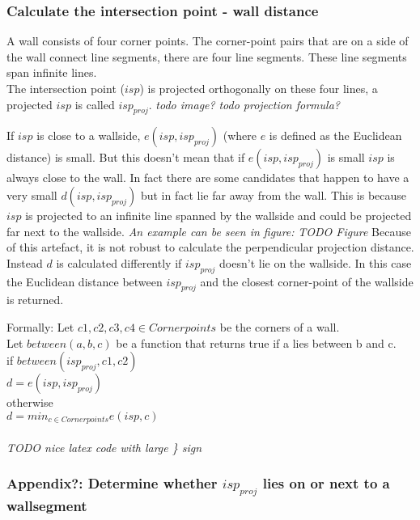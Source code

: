 \documentclass[10pt]{article}
\begin{document}
\subsubsection{Calculate the intersection point - wall distance}
A wall consists of four corner points. The corner-point pairs that are on a
side of the wall connect line segments, there are four line segments. These
line segments span infinite lines.\\

The intersection point ($isp$) is projected orthogonally on these four lines, a
projected $isp$ is called $isp_{proj}$.
\textit{ todo image?}
\textit{ todo projection formula?}

If $isp$ is close to a wallside, $e(isp, isp_{proj})$ (where $e$ is defined as
the Euclidean distance) is small.  But this doesn't mean that if
$e(isp,isp_{proj})$ is small $isp$ is always close to the wall. In fact there are
some candidates that happen to have a very small $d(isp, isp_{proj})$ but in fact
lie far away from the wall. This is because $isp$ is projected to an infinite
line spanned by the wallside and could be projected far next to the wallside.
\textit{ An example can be seen in figure:}
\textit{ TODO Figure}
Because of this artefact, it is not robust to calculate the perpendicular
projection distance.  Instead $d$ is calculated differently if $isp_{proj}$
doesn't lie on the wallside.  In this case the Euclidean distance between
$isp_{proj}$ and the closest corner-point of the wallside is returned.

Formally:
Let $c1,c2,c3,c4 \in Cornerpoints$ be the corners of a wall.\\
Let $between(a,b,c)$ be a function that returns true if a lies between b and c.\\
if $between(isp_{proj}, c1, c2)$\\
$d = e(isp, isp_{proj})$\\
otherwise\\
$d = min_{c \in Cornerpoints} e(isp, c)$\\
\\
\textit{TODO nice latex code with large \} sign}\\


\subsubsection{Appendix?: Determine whether $isp_{proj}$ lies on or next to a wallsegment}


\end{document}
